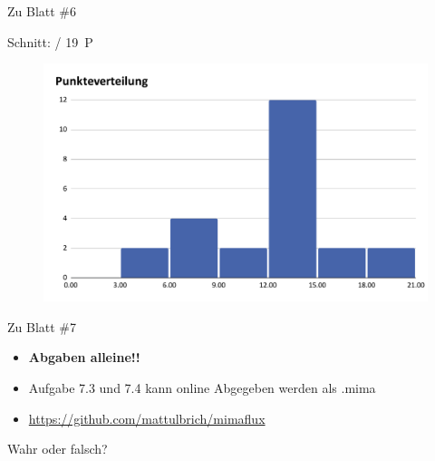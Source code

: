 
\newcommand{\handout}{}



\morescalingdelimiters




\begin{frame}{Zu Blatt \#6}
	
	Schnitt:  / 19~P
	
	\pause
	\begin{figure}
	    \centering
	    \includegraphics[scale=0.45]{./Punkteverteilung.pdf}
	\end{figure}
\end{frame}

\begin{frame}{Zu Blatt \#7}
	\begin{itemize}
	    \item \textbf{Abgaben alleine!!}
        \item Aufgabe 7.3 und 7.4 kann online Abgegeben werden als .mima
        \item \href{https://github.com/mattulbrich/mimaflux}{https://github.com/mattulbrich/mimaflux}
	\end{itemize}
	
\end{frame}


\framePrevEpisode

\begin{frame}[t]{Wahr oder falsch?}
	\Socrative
\end{frame}

